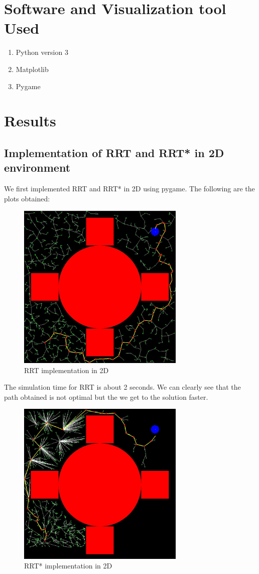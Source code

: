 \documentclass{IEEEtran}
\begin{document}
\section{\textbf{Software and Visualization tool Used}}
\begin{enumerate}
\item Python version 3
\item Matplotlib
\item Pygame
\end{enumerate}
\section{\textbf{Results}}
\subsection{\textbf{Implementation of RRT and RRT* in 2D environment}}
We first implemented RRT and RRT* in 2D using pygame. The following are the plots obtained:
\begin{figure}[h]
    \centering
    \includegraphics[width=8cm]{rrt2d}
    \caption{RRT implementation in 2D}
    \label{fig:RRT implementation in 2D}
\end{figure}
\newline 
The simulation time for RRT is about 2 seconds. We can clearly see that the path obtained is not optimal but the we get to the solution faster.
\newpage
\begin{figure}[h]
    \centering
    \includegraphics[width=8cm]{rrt2d1}
    \caption{RRT* implementation in 2D}
    \label{fig:RRT* implementation in 2D}
\end{figure} 
\end{document}
